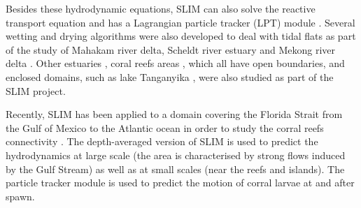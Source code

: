  Besides these hydrodynamic equations, SLIM can also solve the reactive transport equation \citep{gourgue2013depth,deBrauwere2014integrated} and has a Lagrangian particle tracker (LPT) module \citep{thomas2014numerical, critchell2016modelling}. Several wetting and drying algorithms were also developed to deal with tidal flats as part of the study of Mahakam river delta, Scheldt river estuary and Mekong river delta \citep{gourgue2009flux,karna2011fully,le2018new,le2019implicit}. Other estuaries \citep{lebars2016unstructured,vallaeys2018columbia,vallaeys2020congo}, coral reefs areas \citep{legrand2006high,lambrechts2008multi,frys2018fine}, which all have open boundaries, and enclosed domains, such as lake Tanganyika \citep{gourgue2007toward,gourgue2011free,delandmeter2018fully}, were also studied as part of the SLIM project. %

Recently, SLIM has been applied to a domain covering the Florida Strait from the Gulf of Mexico to the Atlantic ocean in order to study the corral reefs connectivity \citep{frys2018fine}. The depth-averaged version of SLIM is used to predict the hydrodynamics at large scale (the area is characterised by strong flows induced by the Gulf Stream) as well as at small scales (near the reefs and islands). The particle tracker module is used to predict the motion of corral larvae at and after spawn. 

